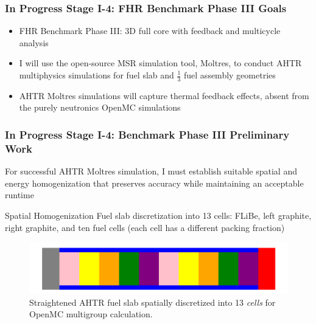 \begin{frame}
    \frametitle{In Progress Stage I-4: FHR Benchmark Phase III Goals}
    \begin{itemize}
        \item FHR Benchmark Phase III: 3D full core with feedback and multicycle 
        analysis
        \item I will use the open-source MSR simulation tool, Moltres, to conduct
        AHTR multiphysics simulations for fuel slab and $\frac{1}{3}$
        fuel assembly geometries 
        \item AHTR Moltres simulations will capture thermal feedback effects, 
        absent from the purely neutronics OpenMC simulations
    \end{itemize}
\end{frame}

\begin{frame}
    \frametitle{In Progress Stage I-4: Benchmark Phase III Preliminary Work}
    For successful AHTR Moltres simulation, I must establish 
    suitable spatial and energy homogenization that preserves accuracy while 
    maintaining an acceptable runtime
\begin{block}{Spatial Homogenization}
    Fuel slab discretization into 13 cells: FLiBe, left graphite, right graphite, 
    and ten fuel cells (each cell has a different packing fraction)
\end{block}
\begin{figure}[]
    \includegraphics[width=0.7\linewidth]{../docs/figures/straightened_slab_mg.png}
    \caption{Straightened AHTR fuel slab spatially discretized into 
    13 \textit{cells} for OpenMC multigroup calculation.}
\end{figure}
\end{frame}

